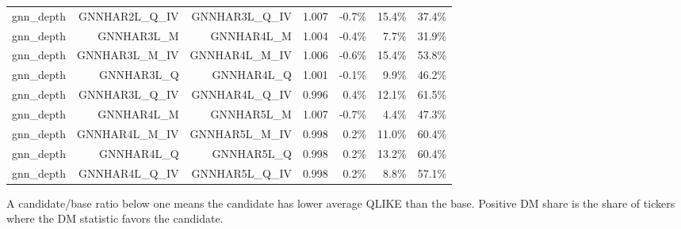 \documentclass[11pt,a4paper]{article}
\begin{document}
\begin{table}[H]
{\begin{tabular}{lrrrrrr}
gnn\_depth & GNNHAR2L\_Q\_IV & GNNHAR3L\_Q\_IV & 1.007 & -0.7\% & 15.4\% & 37.4\% \\
gnn\_depth & GNNHAR3L\_M & GNNHAR4L\_M & 1.004 & -0.4\% & 7.7\% & 31.9\% \\
gnn\_depth & GNNHAR3L\_M\_IV & GNNHAR4L\_M\_IV & 1.006 & -0.6\% & 15.4\% & 53.8\% \\
gnn\_depth & GNNHAR3L\_Q & GNNHAR4L\_Q & 1.001 & -0.1\% & 9.9\% & 46.2\% \\
gnn\_depth & GNNHAR3L\_Q\_IV & GNNHAR4L\_Q\_IV & 0.996 & 0.4\% & 12.1\% & 61.5\% \\
gnn\_depth & GNNHAR4L\_M & GNNHAR5L\_M & 1.007 & -0.7\% & 4.4\% & 47.3\% \\
gnn\_depth & GNNHAR4L\_M\_IV & GNNHAR5L\_M\_IV & 0.998 & 0.2\% & 11.0\% & 60.4\% \\
gnn\_depth & GNNHAR4L\_Q & GNNHAR5L\_Q & 0.998 & 0.2\% & 13.2\% & 60.4\% \\
gnn\_depth & GNNHAR4L\_Q\_IV & GNNHAR5L\_Q\_IV & 0.998 & 0.2\% & 8.8\% & 57.1\% \\
\bottomrule
\end{tabular}
}

\vspace{2pt}\begin{minipage}{0.98\textwidth}\footnotesize A candidate/base ratio below one means the candidate has lower average QLIKE than the base.  Positive DM share is the share of tickers where the DM statistic favors the candidate.\end{minipage}
\end{table}
\end{document}
